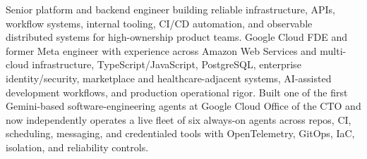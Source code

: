 


Senior platform and backend engineer building reliable infrastructure, APIs, workflow systems, internal tooling, CI/CD automation, and observable distributed systems for high-ownership product teams. Google Cloud FDE and former Meta engineer with experience across Amazon Web Services and multi-cloud infrastructure, TypeScript/JavaScript, PostgreSQL, enterprise identity/security, marketplace and healthcare-adjacent systems, AI-assisted development workflows, and production operational rigor. Built one of the first Gemini-based software-engineering agents at Google Cloud Office of the CTO and now independently operates a live fleet of six always-on agents across repos, CI, scheduling, messaging, and credentialed tools with OpenTelemetry, GitOps, IaC, isolation, and reliability controls.







